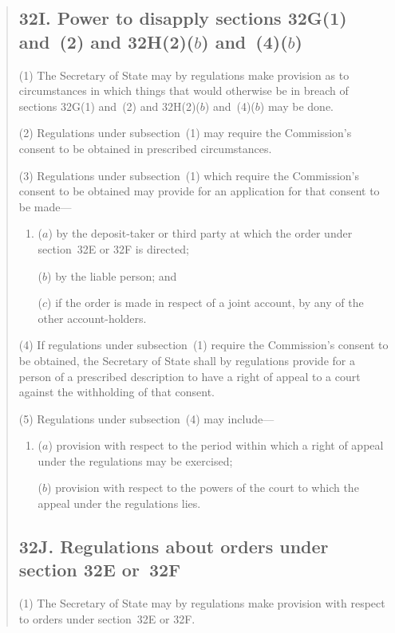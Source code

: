 \documentclass[12pt,a4paper]{article}
\begin{document}
\begin{quotation}
\begin{sloppypar}
\subsection*{32I. Power to disapply sections 32G(1) and~(2) and 32H(2)($b$) and~(4)($b$)}
\end{sloppypar}

(1) The Secretary of State may by regulations make provision as to
circumstances in which things that would otherwise be in breach of sections 32G(1) and~(2) and 32H(2)($b$) and~(4)($b$) may be done.

(2) Regulations under subsection~(1) may require the Commission’s consent
to be obtained in prescribed circumstances.

(3) Regulations under subsection~(1) which require the Commission’s consent
to be obtained may provide for an application for that consent to be made---
\begin{enumerate}\item[]
($a$) by the deposit-taker or third party at which the order under section~32E or
32F is directed;

($b$) by the liable person; and

($c$) if the order is made in respect of a joint account, by any of the other account-holders.
\end{enumerate}

(4) If regulations under subsection~(1) require the Commission’s consent to
be obtained, the Secretary of State shall by regulations provide for a person of a
prescribed description to have a right of appeal to a court against the withholding of
that consent.

(5) Regulations under subsection~(4) may include---
\begin{enumerate}\item[]
($a$) provision with respect to the period within which a right of appeal under the
regulations may be exercised;

($b$) provision with respect to the powers of the court to which the appeal under
the regulations lies.
\end{enumerate}

\subsection*{\sloppy 32J. Regulations about orders under section 32E or~32F}

(1) The Secretary of State may by regulations make provision with respect to orders under section~32E or 32F.


\end{quotation}
\end{document}
